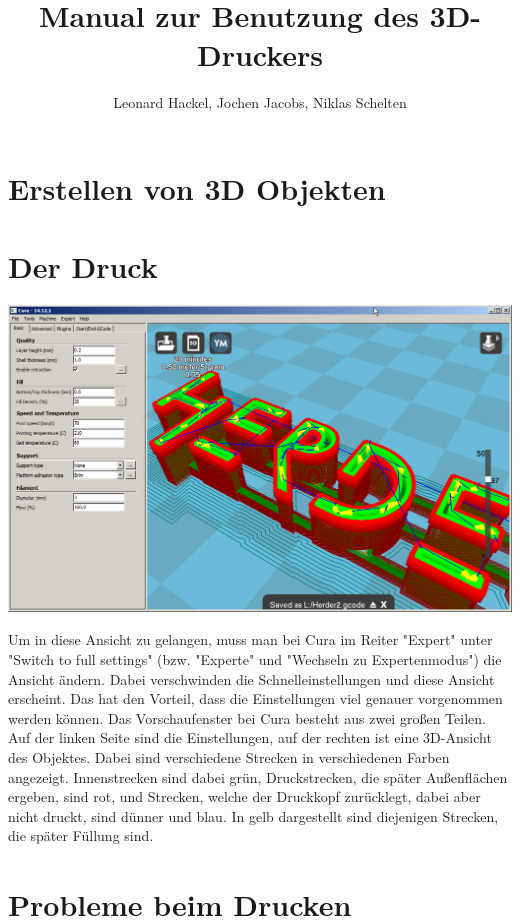 \documentclass[10pt,a4paper]{scrartcl}
\author{Leonard Hackel, Jochen Jacobs, Niklas Schelten}
\title{Manual zur Benutzung des 3D-Druckers}
\begin{document}
\maketitle
\pagebreak
\tableofcontents
\pagebreak
\section{Erstellen von 3D Objekten}

\section{Der Druck}
\begin{center}
\includegraphics[scale=0.3]{res/Cura-window.png}
\end{center}

Um in diese Ansicht zu gelangen, muss man bei Cura im Reiter "Expert" unter "Switch to full settings" (bzw. "Experte" und "Wechseln zu Expertenmodus") die Ansicht ändern. Dabei verschwinden die Schnelleinstellungen und diese Ansicht erscheint. Das hat den Vorteil, dass die Einstellungen viel genauer vorgenommen werden können.
Das Vorschaufenster bei Cura besteht aus zwei großen Teilen. Auf der linken Seite sind die Einstellungen, auf der rechten ist eine 3D-Ansicht des Objektes. Dabei sind verschiedene Strecken in verschiedenen Farben angezeigt. Innenstrecken sind dabei grün, Druckstrecken, die später Außenflächen ergeben, sind rot, und Strecken, welche der Druckkopf zurücklegt, dabei aber nicht druckt, sind dünner und blau. In gelb dargestellt sind diejenigen Strecken, die später Füllung sind.

\section{Probleme beim Drucken}
\end{document}
